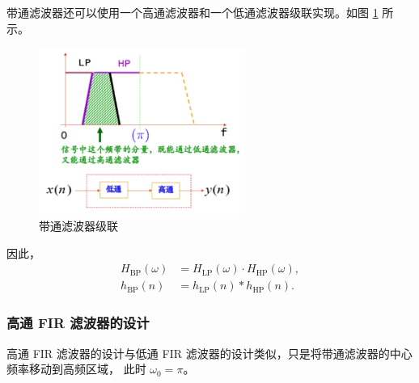 \begin{note}
    带通滤波器还可以使用一个高通滤波器和一个低通滤波器级联实现。如图 \ref{fig:band-pass-filter-cascade} 所示。
    \begin{figure}[H]
        \centering
        \includegraphics[width=0.6\textwidth]{chap4/img/band_pass_filter_cascade.png}
        \caption{带通滤波器级联}
        \label{fig:band-pass-filter-cascade}
    \end{figure}
    因此，
    \begin{align*}
        H_{\text{BP}}(\omega) & = H_{\text{LP}}(\omega) \cdot H_{\text{HP}}(\omega), \\
        h_{\text{BP}}(n) & = h_{\text{LP}}(n) * h_{\text{HP}}(n).
    \end{align*}
\end{note}

\subsubsection{高通 FIR 滤波器的设计}

高通 FIR 滤波器的设计与低通 FIR 滤波器的设计类似，只是将带通滤波器的中心频率移动到高频区域，
此时 $\omega_0 = \pi$。

